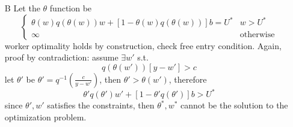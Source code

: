 \documentclass[10pt,landscape,a4paper]{article}
\begin{document}
\begin{multicols*}{3}
\begin{itemize}
    \item[B] Let the $\theta$ function be 
    $$
    \begin{cases}
        \theta(w)q(\theta(w))w+[1-\theta(w)q(\theta(w))]b = U^* & w>U^*\\
        \infty & \text{otherwise}
    \end{cases}
    $$
    worker optimality holds by construction, check free entry condition. Again, proof by contradiction: assume $\exists w'$ s.t.
    $$
    q(\theta(w'))[y-w']> c
    $$
    let $\theta'$ be $\theta' = q^{-1}\left(\frac{c}{y-w'}\right)$, then $\theta'>\theta(w')$, therefore
    $$
    \theta' q(\theta')w' + [1-\theta' q(\theta')]b > U^*
    $$
    since $\theta',w'$ satisfies the constraints, then $\theta^*,w^*$ cannot be the solution to the optimization problem.
    
\end{itemize}

\end{multicols*}
\end{document}
